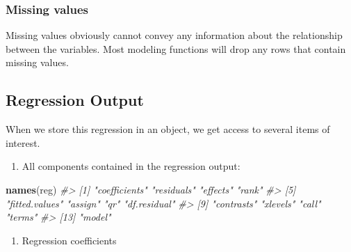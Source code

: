 \documentclass[]{book}
\newenvironment{Shaded}{\begin{snugshade}}{\end{snugshade}}
\newcommand{\CommentTok}[1]{\textcolor[rgb]{0.56,0.35,0.01}{\textit{#1}}}
\newcommand{\KeywordTok}[1]{\textcolor[rgb]{0.13,0.29,0.53}{\textbf{#1}}}
\newcommand{\NormalTok}[1]{#1}
\newcommand{\OperatorTok}[1]{\textcolor[rgb]{0.81,0.36,0.00}{\textbf{#1}}}
\providecommand{\tightlist}{%
  \setlength{\itemsep}{0pt}\setlength{\parskip}{0pt}}
\begin{document}
\hypertarget{missing-values}{%
\subsubsection*{Missing values}\label{missing-values}}

Missing values obviously cannot convey any information about the relationship between the variables. Most modeling functions will drop any rows that contain missing values.

\hypertarget{regression-output}{%
\subsection{Regression Output}\label{regression-output}}

When we store this regression in an object, we get access to several items of interest.

\begin{enumerate}
\def\labelenumi{\arabic{enumi}.}
\tightlist
\item
  All components contained in the regression output:
\end{enumerate}

\begin{Shaded}
\begin{Highlighting}[]
\KeywordTok{names}\NormalTok{(reg)}
\CommentTok{#>  [1] "coefficients"  "residuals"     "effects"       "rank"         }
\CommentTok{#>  [5] "fitted.values" "assign"        "qr"            "df.residual"  }
\CommentTok{#>  [9] "contrasts"     "xlevels"       "call"          "terms"        }
\CommentTok{#> [13] "model"}
\end{Highlighting}
\end{Shaded}

\begin{enumerate}
\def\labelenumi{\arabic{enumi}.}
\setcounter{enumi}{1}
\tightlist
\item
  Regression coefficients
\end{enumerate}

\begin{Shaded}
\end{Shaded}
\end{document}
